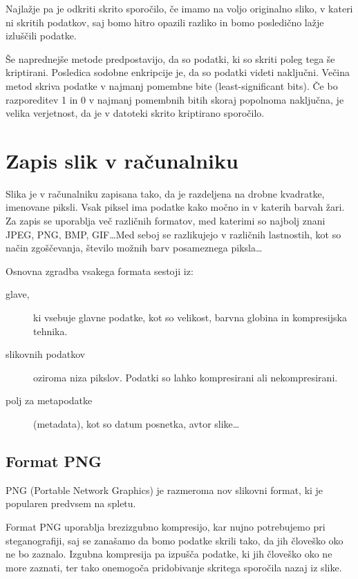 \documentclass[a4paper, 12pt]{article}
\begin{document}
        Najlažje pa je odkriti skrito sporočilo, če imamo na voljo originalno sliko, v kateri ni skritih podatkov, saj bomo hitro opazili razliko in bomo posledično lažje izluščili podatke.

        Še naprednejše metode predpostavijo, da so podatki, ki so skriti poleg tega še kriptirani. Posledica sodobne enkripcije je, da so podatki videti naključni. Večina metod skriva podatke v najmanj pomembne bite (least-significant bits). Če bo razporeditev 1 in 0 v najmanj pomembnih bitih skoraj popolnoma naključna, je velika verjetnost, da je v datoteki skrito kriptirano sporočilo.

      
\section{Zapis slik v računalniku}
    \label{zapisslik}
    Slika je v računalniku zapisana tako, da je razdeljena na drobne kvadratke, imenovane piksli. Vsak piksel ima podatke kako močno in v katerih barvah žari. Za zapis se uporablja več različnih formatov, med katerimi so najbolj znani JPEG, PNG, BMP, GIF\ldots Med seboj se razlikujejo v različnih lastnostih, kot so način zgoščevanja, število možnih barv posameznega piksla\ldots

    Osnovna zgradba vsakega formata sestoji iz:
    \begin{description}
        \item [glave,] ki vsebuje glavne podatke, kot so velikost, barvna globina in kompresijska tehnika. 
        \item [slikovnih podatkov] oziroma niza pikslov. Podatki so lahko kompresirani ali nekompresirani.
        \item [polj za metapodatke] (metadata), kot so datum posnetka, avtor slike\ldots
    \end{description} 

    \subsection{Format PNG}
        PNG (Portable Network Graphics) je razmeroma nov slikovni format, ki je popularen predvsem na spletu.

        Format PNG uporablja brezizgubno kompresijo, kar nujno potrebujemo pri steganografiji, saj se zanašamo da bomo podatke skrili tako, da jih človeško oko ne bo zaznalo. Izgubna kompresija pa izpušča podatke, ki jih človeško oko ne more zaznati, ter tako onemogoča pridobivanje skritega sporočila nazaj iz slike.
\end{document}
